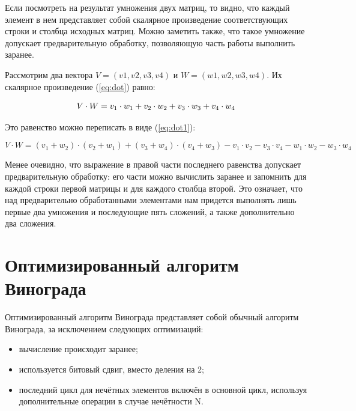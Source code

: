 \documentclass[12pt]{report}
\begin{document}
Если посмотреть на результат умножения двух матриц, то видно, что каждый элемент в нем представляет собой скалярное произведение соответствующих строки и столбца исходных матриц. Можно заметить также, что такое умножение допускает предварительную обработку, позволяющую часть работы выполнить заранее.

Рассмотрим два вектора $V = (v1, v2, v3, v4)$ и $W = (w1, w2, w3, w4)$. Их скалярное произведение (\ref{eq:dot}) равно: 

\begin{equation}
	\label{eq:dot}
	V \cdot W=v_1 \cdot w_1 + v_2 \cdot w_2 + v_3 \cdot w_3 + v_4 \cdot w_4\\
\end{equation}
\newline

Это равенство можно переписать в виде (\ref{eq:dot1}):

\begin{equation}
	\label{eq:dot1}
	V \cdot W=(v_1 + w_2) \cdot (v_2 + w_1) + (v_3 + w_4) \cdot (v_4 + w_3) - v_1 \cdot v_2 - 
	v_3 \cdot v_4 - w_1 \cdot w_2 - w_3 \cdot w_4
\end{equation}

Менее очевидно, что выражение в правой части последнего равенства допускает предварительную обработку: его части можно вычислить заранее и запомнить для каждой строки первой матрицы и для каждого столбца второй. 
Это означает, что над предварительно обработанными элементами нам придется выполнять лишь первые два умножения и последующие пять сложений, а также дополнительно два сложения.

\section{Оптимизированный алгоритм Винограда}
Оптимизированный алгоритм Винограда представляет собой обычный алгоритм Винограда, за исключением следующих оптимизаций:

\begin{itemize}
	\item вычисление происходит заранее;
	\item используется битовый сдвиг, вместо деления на 2;
	\item последний цикл для нечётных элементов включён в основной цикл, используя дополнительные операции в случае нечётности N.
\end{itemize}
\end{document}
